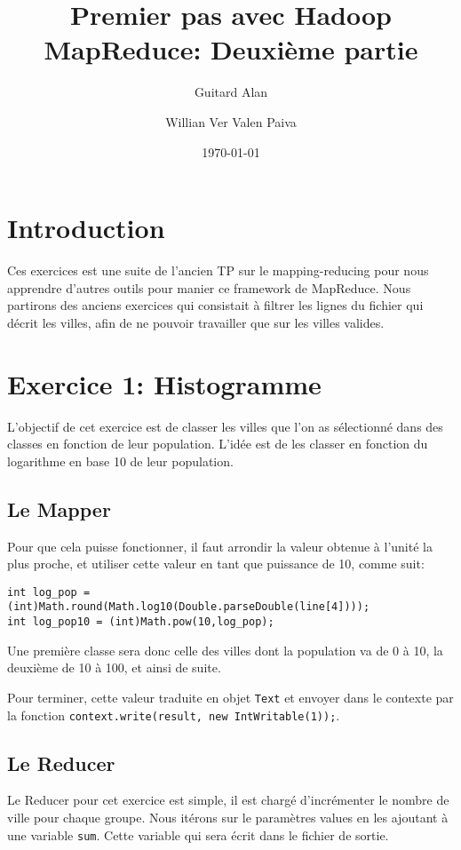 \documentclass[a4paper]{article}
\author{Guitard Alan \and Willian Ver Valen Paiva }
\date{\today}
\title{Premier pas avec Hadoop MapReduce: Deuxième partie}
\begin{document}
\maketitle

\tableofcontents

\newpage

\section{Introduction}
	
	Ces exercices est une suite de l'ancien TP sur le mapping-reducing pour nous apprendre d'autres outils pour manier ce framework de MapReduce.
	Nous partirons des anciens exercices qui consistait à filtrer les lignes du fichier qui décrit les villes, afin de ne pouvoir travailler que sur les villes valides.

\section{Exercice 1: Histogramme}

L'objectif de cet exercice est de classer les villes que l'on as sélectionné dans des classes en fonction de leur population. L'idée est de les classer en fonction du logarithme en base 10 de leur population.

\subsection{Le Mapper}
Pour que cela puisse fonctionner, il faut arrondir la valeur obtenue à l'unité la plus proche, et utiliser cette valeur en tant que puissance de 10, comme suit:
\begin{lstlisting}
int log_pop = (int)Math.round(Math.log10(Double.parseDouble(line[4])));
int log_pop10 = (int)Math.pow(10,log_pop);
\end{lstlisting}

Une première classe sera donc celle des villes dont la population va de 0 à 10, la deuxième de 10 à 100, et ainsi de suite. 

Pour terminer, cette valeur traduite en objet \verb?Text? et envoyer dans le contexte par la fonction \verb?context.write(result, new IntWritable(1));?.

\subsection{Le Reducer}
Le Reducer pour cet exercice est simple, il est chargé d'incrémenter le nombre de ville pour chaque groupe.
Nous itérons sur le paramètres values en les ajoutant à une variable \verb?sum?. Cette variable qui sera écrit dans le fichier de sortie.
\end{document}
